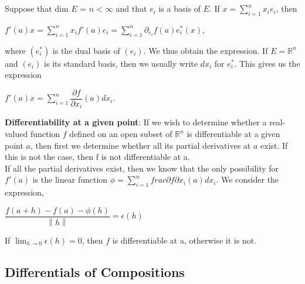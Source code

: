 \documentclass[12 pt]{article}
\theoremstyle{definition}
\theoremstyle{remark}
\newcommand{\R}{\mathbb{R}}
\newcommand\norm[1]{\left\lVert#1\right\rVert}
\begin{document}

\normalfont \\~\\

Suppose that dim $E$ = $n < \infty$ and that $e_i$ is a basis of $E$. If $ x = \sum_{i=1}^{n} x_i e_i$, then\\
\begin{center}
$ f'(a)x = \sum_{i=1}^{n} x_i f'(a) e_i = \sum_{i=1}^{n} \partial_{e_i} f(a) e_i^*(x)$,
\end{center}

where $(e_i^*)$ is the dual basis of $(e_i)$. We thus obtain the expression. If $E = \R^n$ and $(e_i)$ is its standard basis, then we usually write $dx_i$ for $e_i^*$. This gives us the expression \\
\begin{center}
$ f'(a)x = \sum_{i=1}^{n} \dfrac{\partial f}{\partial x_i} (a) dx_i $.
\end{center}

\textbf{Differentiability at a given point}:
If we wish to determine whether a real-valued function $f$ defined on an open subset of $\R^n$ is differentiable at a given point $a$, then first we determine whether all its partial derivatives at $a$
exist. If this is not the case, then f is not differentiable at a.\\ 
If all the partial derivatives exist, then we know that the only possibility for $f'(a)$ is the linear function $ \phi = \sum_{i=1}^{n} frac{\partial f}{\partial x_i} (a) dx_i $. We consider the expression,\\

\begin{center}

$ \dfrac{f(a+h) - f(a) - \phi (h)}{\norm{h}} = \epsilon (h)$
\end{center}

If $\lim_{h \to 0} \epsilon (h) =  0$, then $f$ is differentiable at a, otherwise it is not. \\

\subsection{Differentials of Compositions}
\end{document}
